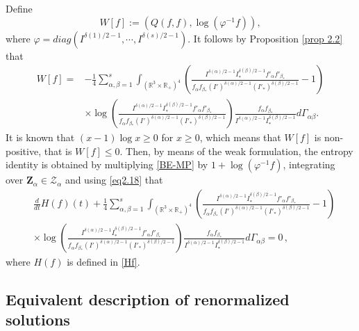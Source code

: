 \documentclass[reqno,11pt]{amsart}
\numberwithin{equation}{section}
\def\R{\mathbb{R}}
\begin{document}
Define 
\begin{equation}\label{W[f]}
	W[f]:=(Q(f,f),\log (\varphi ^{-1} f )) ,
\end{equation}
where $\varphi = diag (I^{\delta(1)/2-1} , \cdots, I^{\delta(s)/2-1})$. It follows by Proposition \ref{prop 2.2} that
\begin{equation}
	\begin{aligned}
		W[f]=&-\tfrac{1}{4}\sum \limits_{\alpha , \beta =1}^s \int_{(\R^3\times \R_+)^4} 
		 (\tfrac{I^{\delta(\alpha)/2-1} I_* ^{\delta(\beta)/2-1}f'_\alpha f'_{\beta_*}  }
		{f_\alpha f_{\beta_* } (I')^{\delta(\alpha)/2-1} (I'_* )^{\delta(\beta)/2-1}} - 1) \\
		&\times \log (\tfrac{I^{\delta(\alpha)/2-1} I_* ^{\delta(\beta)/2-1} f'_\alpha f'_{\beta_*}}{f_\alpha f_{\beta_* } (I')^{\delta(\alpha)/2-1} (I'_* )^{\delta(\beta)/2-1} } ) \tfrac{f_\alpha f_{\beta_* } }{I^{\delta(\alpha)/2-1} I_* ^{\delta(\beta)/2-1} }d\Gamma_{\alpha \beta  } .
	\end{aligned}
\end{equation}
It is known that $(x-1)\log x \geq 0$ for $x\geq 0$, which means that $W[f]$ is non-positive, that is $W[f]\leq 0.$ Then, by means of the weak formulation, the entropy identity is obtained by multiplying \eqref{BE-MP} by $1+\log (\varphi^{-1} f)$, integrating over $ \mathbf{Z}_\alpha \in \mathcal{Z}_\alpha $ and using \eqref{eq2.18} that
\begin{equation}\label{EntropyId}
	\begin{aligned}
		&\tfrac{d}{dt} H(f)(t) +
		\tfrac{1}{4} \sum \limits_{\alpha , \beta =1}^s  \int_{(\R^3\times \R_+)^4} 
		(\tfrac{I^{\delta(\alpha)/2-1} I_* ^{\delta(\beta)/2-1}f'_\alpha f'_{\beta_*}  } {f_\alpha f_{\beta_* } (I')^{\delta(\alpha)/2-1} (I'_* )^{\delta(\beta)/2-1}} - 1) \\
		& \times \log (\tfrac{I^{\delta(\alpha)/2-1} I_* ^{\delta(\beta)/2-1} f'_\alpha f'_{\beta_*}}{f_\alpha f_{\beta_* } (I')^{\delta(\alpha)/2-1} (I'_* )^{\delta(\beta)/2-1} } ) \tfrac{f_\alpha f_{\beta_* } }{I^{\delta(\alpha)/2-1} I_* ^{\delta(\beta)/2-1} }d\Gamma_{\alpha \beta  } = 0 \,,
	\end{aligned}
\end{equation}
where $H(f)$ is defined in \eqref{Hf}.


\subsection{Equivalent description of renormalized solutions}
\end{document}
